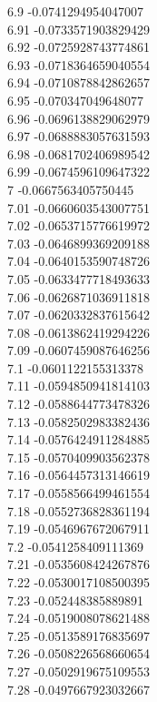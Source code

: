 {6.9	-0.0741294954047007\\
6.91	-0.0733571903829429\\
6.92	-0.0725928743774861\\
6.93	-0.0718364659040554\\
6.94	-0.0710878842862657\\
6.95	-0.070347049648077\\
6.96	-0.0696138829062979\\
6.97	-0.0688883057631593\\
6.98	-0.0681702406989542\\
6.99	-0.0674596109647322\\
7	-0.0667563405750445\\
7.01	-0.0660603543007751\\
7.02	-0.0653715776619972\\
7.03	-0.0646899369209188\\
7.04	-0.0640153590748726\\
7.05	-0.0633477718493633\\
7.06	-0.0626871036911818\\
7.07	-0.0620332837615642\\
7.08	-0.0613862419294226\\
7.09	-0.0607459087646256\\
7.1	-0.0601122155313378\\
7.11	-0.0594850941814103\\
7.12	-0.0588644773478326\\
7.13	-0.0582502983382436\\
7.14	-0.0576424911284885\\
7.15	-0.0570409903562378\\
7.16	-0.0564457313146619\\
7.17	-0.0558566499461554\\
7.18	-0.0552736828361194\\
7.19	-0.0546967672067911\\
7.2	-0.0541258409111369\\
7.21	-0.0535608424267876\\
7.22	-0.0530017108500395\\
7.23	-0.052448385889891\\
7.24	-0.0519008078621488\\
7.25	-0.0513589176835697\\
7.26	-0.0508226568660654\\
7.27	-0.0502919675109553\\
7.28	-0.0497667923032667\\
}
